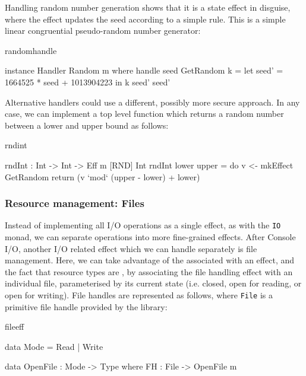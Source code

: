\noindent
Handling random number generation shows that it is a state effect in
disguise, where the effect updates the seed according to a simple rule.
This is a simple linear congruential pseudo-random number generator:

\begin{SaveVerbatim}{randomhandle}

instance Handler Random m where
    handle seed GetRandom k
         = let seed' = 1664525 * seed + 1013904223 in
               k seed' seed'

\end{SaveVerbatim}

\noindent
Alternative handlers could use a different, possibly more secure approach.
In any case, we can implement a top level function which returns a random
number between a lower and upper bound as follows:

\begin{SaveVerbatim}{rndint}

rndInt : Int -> Int -> Eff m [RND] Int
rndInt lower upper 
    = do v <- mkEffect GetRandom 
         return (v `mod` (upper - lower) + lower)

\end{SaveVerbatim}

\subsubsection{Resource management: Files}

Instead of implementing all I/O operations as a single effect, as with the
\texttt{IO} monad, we can separate operations into more fine-grained effects.
After Console I/O, another I/O related effect which we can handle separately
is file management. Here, we can take advantage of the 
associated with an effect, and the fact that resource types are ,
by associating the file handling effect with an individual file, parameterised
by its current state (i.e. closed, open for reading, or open for writing).
File handles are represented as follows, where \texttt{File} is a primitive
file handle provided by the \Idris{} library:

\begin{SaveVerbatim}{fileeff}

data Mode = Read | Write

data OpenFile : Mode -> Type where
     FH : File -> OpenFile m

\end{SaveVerbatim}

